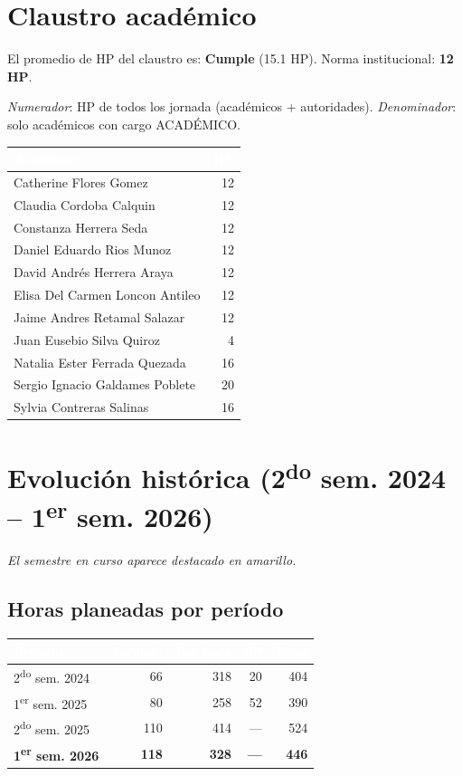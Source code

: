 \documentclass[11pt, a4paper]{article}
\begin{document}
\section{Claustro académico}

El promedio de HP del claustro es: \textcolor{green!60!black}{\textbf{Cumple}} (15.1 HP). Norma institucional: \textbf{12 HP}.

\textit{Numerador}: HP de todos los jornada (académicos + autoridades). \textit{Denominador}: solo académicos con cargo ACADÉMICO.

\begin{tabular}{lr}
\toprule
\rowcolor{usachDark} \textbf{\textcolor{white}{Académico}} & \textbf{\textcolor{white}{HP}} \\
\midrule
Catherine Flores Gomez & 12 \\
\rowcolor{rowEven}Claudia Cordoba Calquin & 12 \\
Constanza Herrera Seda & 12 \\
\rowcolor{rowEven}Daniel Eduardo Rios Munoz & 12 \\
David Andrés Herrera Araya & 12 \\
\rowcolor{rowEven}Elisa Del Carmen Loncon Antileo & 12 \\
Jaime Andres Retamal Salazar & 12 \\
\rowcolor{rowEven}Juan Eusebio Silva Quiroz & 4 \\
Natalia Ester Ferrada Quezada & 16 \\
\rowcolor{rowEven}Sergio Ignacio Galdames Poblete & 20 \\
Sylvia Contreras Salinas & 16 \\
\bottomrule
\end{tabular}

\section{Evolución histórica (2\textsuperscript{do} sem. 2024 -- 1\textsuperscript{er} sem. 2026)}

\textit{El semestre en curso aparece destacado en amarillo.}

\subsection{Horas planeadas por período}

\begin{tabular}{lrrrr}
\toprule
\rowcolor{usachDark} \textbf{\textcolor{white}{Periodo}} & \textbf{\textcolor{white}{Jornada}} & \textbf{\textcolor{white}{Por hora}} & \textbf{\textcolor{white}{SP}} & \textbf{\textcolor{white}{Total}} \\
\midrule
2\textsuperscript{do} sem. 2024 & 66 & 318 & 20 & 404 \\
\rowcolor{rowEven}1\textsuperscript{er} sem. 2025 & 80 & 258 & 52 & 390 \\
2\textsuperscript{do} sem. 2025 & 110 & 414 & --- & 524 \\
\rowcolor{rowHighlight}\textbf{1\textsuperscript{er} sem. 2026} & \textbf{118} & \textbf{328} & \textbf{---} & \textbf{446} \\
\bottomrule
\end{tabular}
\end{document}
